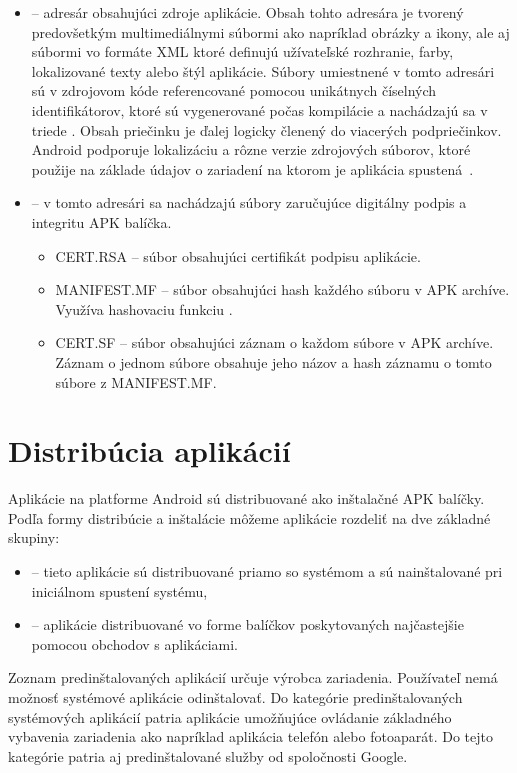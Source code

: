 \begin{itemize}
	\item {} -- adresár obsahujúci zdroje aplikácie. Obsah tohto adresára je tvorený predovšetkým multimediálnymi súbormi ako napríklad obrázky a ikony, ale aj súbormi vo formáte XML ktoré definujú užívateľské rozhranie, farby, lokalizované texty alebo štýl aplikácie. Súbory umiestnené v tomto adresári sú v zdrojovom kóde referencované pomocou unikátnych číselných identifikátorov, ktoré sú vygenerované počas kompilácie a nachádzajú sa v triede . Obsah priečinku je ďalej logicky členený do viacerých podpriečinkov. Android podporuje lokalizáciu a rôzne verzie zdrojových súborov, ktoré použije na základe údajov o zariadení na ktorom je aplikácia spustená~\cite{Resources}.
	
	\item {} -- v tomto adresári sa nachádzajú súbory zaručujúce digitálny podpis a integritu APK balíčka. 
		\begin{itemize}
			\item CERT.RSA  -- súbor obsahujúci certifikát podpisu aplikácie.
			\item MANIFEST.MF  -- súbor obsahujúci hash každého súboru v APK archíve. Využíva hashovaciu funkciu .
			\item CERT.SF  -- súbor obsahujúci záznam o každom súbore v APK archíve. Záznam o jednom súbore obsahuje jeho názov a  hash záznamu o tomto súbore z MANIFEST.MF.
		\end{itemize}		
		
		
\end{itemize} 


\section{Distribúcia aplikácií}
Aplikácie na platforme Android sú distribuované ako inštalačné APK balíčky. 
Podľa formy distribúcie a inštalácie môžeme aplikácie rozdeliť na dve základné skupiny:
\begin{itemize}
 \item {} -- tieto aplikácie sú distribuované priamo so systémom a sú nainštalované pri iniciálnom spustení systému,
 \item {} -- aplikácie distribuované vo forme balíčkov poskytovaných najčastejšie pomocou obchodov s aplikáciami.
\end{itemize}

Zoznam predinštalovaných aplikácií určuje výrobca zariadenia. Používateľ nemá možnosť systémové aplikácie odinštalovať. Do kategórie predinštalovaných systémových aplikácií patria aplikácie umožňujúce ovládanie základného vybavenia zariadenia ako napríklad aplikácia telefón alebo fotoaparát. Do tejto kategórie patria aj predinštalované služby od spoločnosti Google. 

